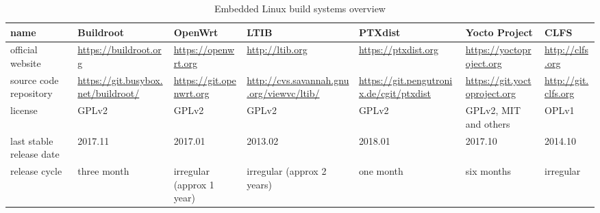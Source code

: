 \documentclass[printmode]{mgr}
\begin{document}
\begin{landscape}

\begin{table}
  \begin{tabular}{| p{3cm} | p{3cm} | p{3cm} | p{3cm} | p{3cm} | p{3cm} | p{3cm} |}
    \hline
    name & Buildroot & OpenWrt & LTIB & PTXdist & Yocto Project & CLFS \\
    \hline
    official website & \url{https://buildroot.org} & \url{https://openwrt.org} & \url{http://ltib.org} & \url{https://ptxdist.org} & \url{https://yoctoproject.org} & \url{http://clfs.org}\\
    \hline
    source code repository & \url{https://git.busybox.net/buildroot/} & \url{https://git.openwrt.org} & \url{http://cvs.savannah.gnu.org/viewvc/ltib/} & \url{https://git.pengutronix.de/cgit/ptxdist} & \url{https://git.yoctoproject.org} & \url{http://git.clfs.org} \\
    \hline
    license & GPLv2\cite{web:buildroot-license} & GPLv2\cite{web:openwrt-license} & GPLv2\cite{web:ltib-license} & GPLv2\cite{web:ptxdist-license} & GPLv2, MIT and others\cite{web:yoctoproject-license} & OPLv1\cite{web:clfs-license} \\
    \hline
    last stable release date & 2017.11 & 2017.01 & 2013.02 & 2018.01 & 2017.10 & 2014.10\\
    \hline
    release cycle & three month\cite{web:buildroot-releases} & irregular (approx 1 year) & irregular (approx 2 years)\cite{web:ltib-releases} & one month\cite{web:ptxdist-releases} & six months\cite{web:yoctoproject-releases} & irregular\cite{web:clfs-releases}\\
    \hline
  \end{tabular}
  \caption{Embedded Linux build systems overview}
\end{table}












\end{landscape}
\end{document}
